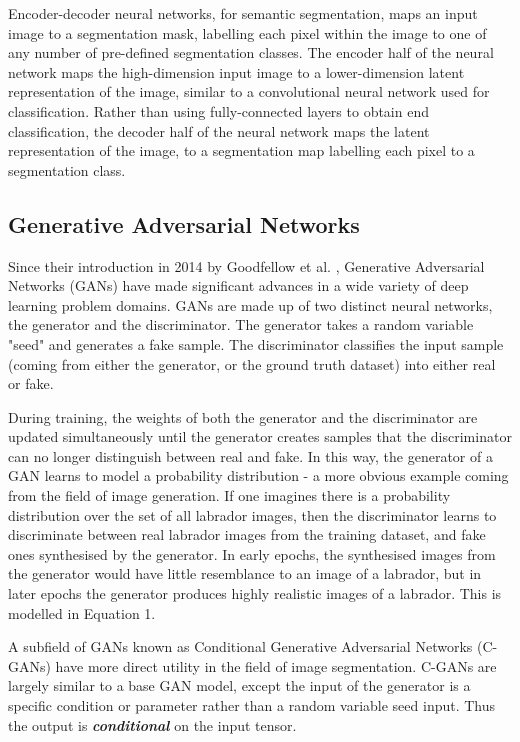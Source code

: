 Encoder-decoder neural networks, for semantic segmentation, maps an input image
to a segmentation mask, labelling each pixel within the image to one of any
number of pre-defined segmentation classes. The encoder half of the neural
network maps the high-dimension input image to a lower-dimension latent
representation of the image, similar to a convolutional neural network used for
classification. Rather than using fully-connected layers to obtain end
classification, the decoder half of the neural network maps the latent
representation of the image, to a segmentation map labelling each pixel to a
segmentation class. \newline

\subsection{Generative Adversarial Networks}

Since their introduction in 2014 by Goodfellow et al.
\cite{goodfellowGenerativeAdversarialNets2014}, Generative Adversarial Networks
(GANs) have made significant advances in a wide variety of deep learning problem
domains. GANs are made up of two distinct neural networks, the generator and the
discriminator. The generator takes a random variable "seed" and generates a fake
sample. The discriminator classifies the input sample (coming from either the
generator, or the ground truth dataset) into either real or fake.
\newline

During training, the weights of both the generator and the discriminator are
updated simultaneously until the generator creates samples that the
discriminator can no longer distinguish between real and fake. In this way, the
generator of a GAN learns to model a probability distribution - a more obvious
example coming from the field of image generation. If one imagines there is a
probability distribution over the set of all labrador images, then the
discriminator learns to discriminate between real labrador images from the
training dataset, and fake ones synthesised by the generator. In early epochs,
the synthesised images from the generator would have little resemblance to an
image of a labrador, but in later epochs the generator produces highly realistic
images of a labrador. This is modelled in Equation 1.\newline

A subfield of GANs known as Conditional Generative Adversarial Networks (C-GANs)
have more direct utility in the field of image segmentation. C-GANs are largely
similar to a base GAN model, except the input of the generator is a specific
condition or parameter rather than a random variable seed input. Thus the output
is \textbf{\emph{conditional}} on the input tensor. \newline

